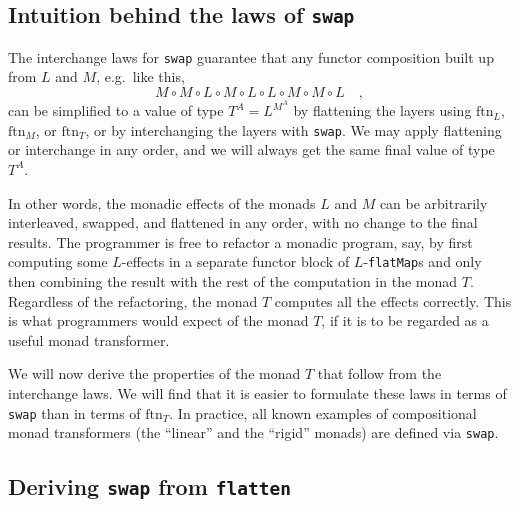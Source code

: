 \subsection{Intuition behind the laws of \texttt{swap}}

The interchange laws for \lstinline!swap!
guarantee that any functor composition built up from $L$ and $M$,
e.g.~like this,
\[
M\circ M\circ L\circ M\circ L\circ L\circ M\circ M\circ L\quad,
\]
can be simplified to a value of type $T^{A}=L^{M^{A}}$ by flattening
the layers using $\text{ftn}_{L}$, $\text{ftn}_{M}$, or $\text{ftn}_{T}$,
or by interchanging the layers with \lstinline!swap!.
We may apply flattening or interchange in any order, and we will always
get the same final value of type $T^{A}$.

In other words, the monadic effects of the monads $L$ and $M$ can
be arbitrarily interleaved, swapped, and flattened in any order, with
no change to the final results. The programmer is free to refactor
a monadic program, say, by first computing some $L$-effects in a
separate functor block of $L$-\lstinline!flatMap!s
and only then combining the result with the rest of the computation
in the monad $T$. Regardless of the refactoring, the monad $T$ computes
all the effects correctly. This is what programmers would expect of
the monad $T$, if it is to be regarded as a useful monad transformer.

We will now derive the properties of the monad $T$ that follow from
the interchange laws. We will find that it is easier to formulate
these laws in terms of \lstinline!swap!
than in terms of $\text{ftn}_{T}$. In practice, all known examples
of compositional monad transformers (the ``linear'' and the ``rigid''
monads) are defined via \lstinline!swap!.

\subsection{Deriving \texttt{swap} from \texttt{flatten\label{subsec:Deriving-swap-from-flatten}}}

